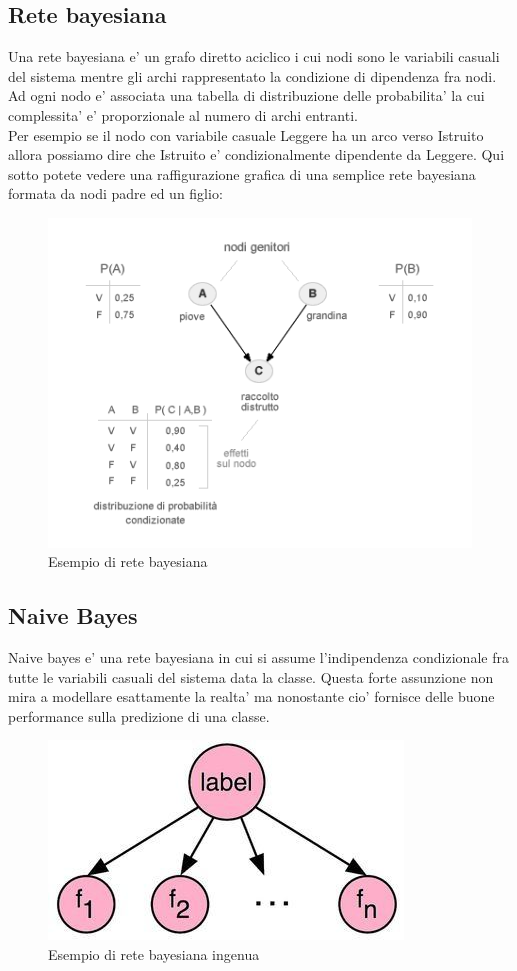 \subsection{Rete bayesiana}
Una rete bayesiana e' un grafo diretto aciclico i cui nodi sono le variabili casuali del sistema mentre gli archi rappresentato la condizione di dipendenza fra nodi.
 Ad ogni nodo e' associata una tabella di distribuzione delle probabilita' la cui complessita' e' proporzionale al numero di archi entranti.\\ Per esempio se il nodo con variabile casuale Leggere ha un arco verso Istruito allora possiamo dire che Istruito e' condizionalmente dipendente da Leggere. Qui sotto potete vedere una raffigurazione grafica di una semplice rete bayesiana formata da nodi padre ed un figlio:
\begin{figure}[H]
	\centering
	\includegraphics[width=0.7\linewidth]{img/rete-bayesiana-grafo.png}
	\caption{Esempio di rete bayesiana}
	\label{fig:rete-bayesiana-grafo}
\end{figure}
\medskip
\subsection{Naive Bayes}
Naive bayes e' una rete bayesiana in cui si assume l'indipendenza condizionale fra tutte le variabili casuali del sistema data la classe. Questa forte assunzione non mira a modellare esattamente la realta' ma nonostante cio' fornisce delle buone performance sulla predizione di una classe.

\begin{figure}[H]
	\centering
	\includegraphics[width=0.4\linewidth]{img/naive_bayes_example}
	\caption{Esempio di rete bayesiana ingenua}
	\label{fig:naivebayesexample}
\end{figure}

